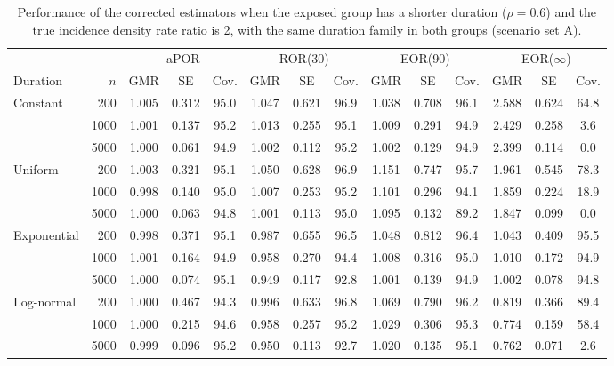 \begin{table}[!htbp]
\centering
\begin{adjustwidth}{-2.25in}{0in}
\caption{Performance of the corrected estimators when the exposed group has a shorter duration ($\rho=0.6$) and the true incidence density rate ratio is 2, with the same duration family in both groups (scenario set A).}
\label{tab:adj}
\small
\setlength{\tabcolsep}{4pt}
\begin{threeparttable}
\begin{tabular}{@{}lrcccccccccccc@{}}
\toprule
 & & \multicolumn{3}{c}{aPOR} & \multicolumn{3}{c}{ROR(30)} & \multicolumn{3}{c}{EOR(90)} & \multicolumn{3}{c}{EOR($\infty$)} \\
\cmidrule(lr){3-5}\cmidrule(lr){6-8}\cmidrule(lr){9-11}\cmidrule(l){12-14}
Duration & $n$ & GMR & SE & Cov. & GMR & SE & Cov. & GMR & SE & Cov. & GMR & SE & Cov. \\
\midrule
Constant & 200 & 1.005 & 0.312 & 95.0 & 1.047 & 0.621 & 96.9 & 1.038 & 0.708 & 96.1 & 2.588 & 0.624 & 64.8 \\
 & 1000 & 1.001 & 0.137 & 95.2 & 1.013 & 0.255 & 95.1 & 1.009 & 0.291 & 94.9 & 2.429 & 0.258 & 3.6 \\
 & 5000 & 1.000 & 0.061 & 94.9 & 1.002 & 0.112 & 95.2 & 1.002 & 0.129 & 94.9 & 2.399 & 0.114 & 0.0 \\
Uniform & 200 & 1.003 & 0.321 & 95.1 & 1.050 & 0.628 & 96.9 & 1.151 & 0.747 & 95.7 & 1.961 & 0.545 & 78.3 \\
 & 1000 & 0.998 & 0.140 & 95.0 & 1.007 & 0.253 & 95.2 & 1.101 & 0.296 & 94.1 & 1.859 & 0.224 & 18.9 \\
 & 5000 & 1.000 & 0.063 & 94.8 & 1.001 & 0.113 & 95.0 & 1.095 & 0.132 & 89.2 & 1.847 & 0.099 & 0.0 \\
Exponential & 200 & 0.998 & 0.371 & 95.1 & 0.987 & 0.655 & 96.5 & 1.048 & 0.812 & 96.4 & 1.043 & 0.409 & 95.5 \\
 & 1000 & 1.001 & 0.164 & 94.9 & 0.958 & 0.270 & 94.4 & 1.008 & 0.316 & 95.0 & 1.010 & 0.172 & 94.9 \\
 & 5000 & 1.000 & 0.074 & 95.1 & 0.949 & 0.117 & 92.8 & 1.001 & 0.139 & 94.9 & 1.002 & 0.078 & 94.8 \\
Log-normal & 200 & 1.000 & 0.467 & 94.3 & 0.996 & 0.633 & 96.8 & 1.069 & 0.790 & 96.2 & 0.819 & 0.366 & 89.4 \\
 & 1000 & 1.000 & 0.215 & 94.6 & 0.958 & 0.257 & 95.2 & 1.029 & 0.306 & 95.3 & 0.774 & 0.159 & 58.4 \\
 & 5000 & 0.999 & 0.096 & 95.2 & 0.950 & 0.113 & 92.7 & 1.020 & 0.135 & 95.1 & 0.762 & 0.071 & 2.6 \\

\end{tabular}
\end{threeparttable}
\end{adjustwidth}
\end{table}
